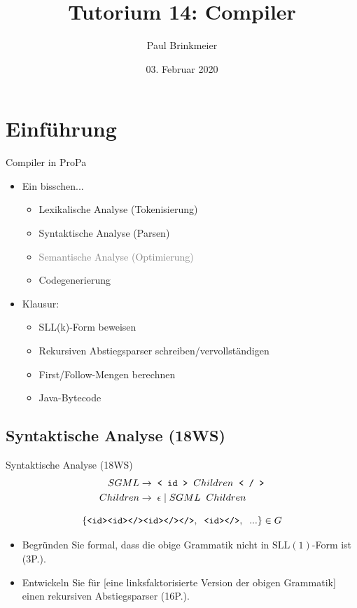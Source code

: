 \documentclass{beamer}
\title{Tutorium 14: Compiler}
\author{Paul Brinkmeier}
\institute{Tutorium Programmierparadigmen am KIT}
\date{03. Februar 2020}
\begin{document}
\begin{frame}
	\titlepage
\end{frame}

\section{Einführung}

\begin{frame}{Compiler in ProPa}
	\begin{itemize}
		\item Ein bisschen...
		\begin{itemize}
			\item Lexikalische Analyse (Tokenisierung)
			\item Syntaktische Analyse (Parsen)
			\item \textcolor{gray}{Semantische Analyse (Optimierung)}
			\item Codegenerierung
		\end{itemize}
		\pause
		\item Klausur:
		\begin{itemize}
			\item SLL(k)-Form beweisen
			\item Rekursiven Abstiegsparser schreiben/vervollständigen
			\item First/Follow-Mengen berechnen
			\item Java-Bytecode
		\end{itemize}
	\end{itemize}
\end{frame}

\subsection{Syntaktische Analyse (18WS)}

\begin{frame}{Syntaktische Analyse (18WS)}
	\begin{align*}
		SGML \to & \;\; \textrm{\texttt{< id >}} \;\; Children \;\; \textrm{\texttt{< / >}}\\
		Children \to & \;\; \epsilon \mid SGML \;\; Children
	\end{align*}

	\begin{equation*}
		\{\textrm{\texttt{<id><id></><id></></>}},\;\;\textrm{\texttt{<id></>}},\;\;...\} \in G
	\end{equation*}

	\pause
	\begin{itemize}
		\item Begründen Sie formal, dass die obige Grammatik nicht in $\textrm{SLL}(1)$-Form ist (3P.).
		\pause
		\item Entwickeln Sie für [eine linksfaktorisierte Version der obigen Grammatik] einen rekursiven Abstiegsparser (16P.).
	\end{itemize}
\end{frame}
\end{document}

